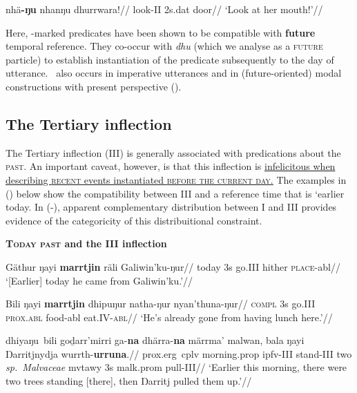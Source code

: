\a\begingl\gla nhä\textbf{-ŋu} nhanŋu dhurrwara!//
\glb look-\gls{II} 2s.\gls{dat} door//
\glft`Look at her mouth!'\trailingcitation[AW 20180731]//\endgl

\xe

Here, \II-marked predicates have been shown to be compatible with \textbf{future} temporal reference. They co-occur with \textit{dhu} (which we analyse as a \textsc{future} particle) to establish instantiation of the predicate subsequently to the day of utterance. \II~also occurs in imperative utterances and in (future-oriented) modal constructions with present perspective ().


\subsection{The Tertiary inflection}\label{desc-iii}

The Tertiary inflection (\gls{III}) is generally associated with predications about the \textsc{past}. An important caveat, however, is that this inflection is \ul{infelicitous when describing \textsc{recent} events instantiated \textsc{before the current day}.} The examples in (\nextx) below show the compatibility between \gls{III} and a reference time that is `earlier today. In (-), apparent complementary distribution between \gls{I} and \gls{III} provides evidence of the categoricity of this distribuitional constraint.

\pex \textbf{\textsc{Today past} and the \gls{III} inflection}


\a{}\begingl\gla Gäthur ŋayi \textbf{marrtjin} räli Galiwin'ku-ŋur//
\glb today 3s go.\gls{III} hither \textsc{place}-\gls{abl}//
\glft`[Earlier] today he came from Galiwin'ku.'//\endgl

\a{}\begingl\gla Bili ŋayi \textbf{marrtjin} dhipuŋur natha-ŋur nyan'thuna-ŋur//
\glb \textsc{compl} 3s go.\gls{III} \textsc{prox.abl} food-\gls{abl} eat.\gls{IV}-\textsc{abl}//
\glft`He's already gone from having lunch here.'//\endgl

\a\begingl\gla dhiyaŋu~bili goḏarr'mirri ga-\textbf{na} dhärra-\textbf{na} märrma' malwan, bala ŋayi Ŋarritjnydja wurrth-\textbf{urruna}.//
\glb \gls{prox}.\gls{erg}~\gls{cplv} morning.\gls{prop} \gls{ipfv}-\gls{III} stand-\gls{III} two \textit{sp.~Malvaceae} \gls{mvtawy} 3s \gls{malk}.\gls{prom} pull-\gls{III}//
\glft`Earlier this morning, there were two trees standing [there], then Ŋarritj pulled them up.'\trailingcitation{[DB~20190405]}//\endgl

